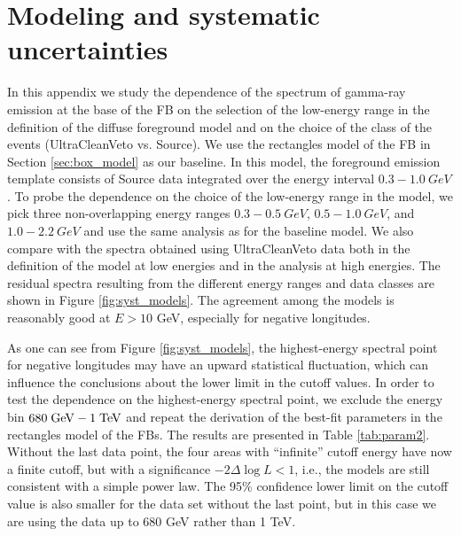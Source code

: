 \section{Modeling and systematic uncertainties}

In this appendix we study the dependence of the spectrum of gamma-ray emission at the base of the FB
on the selection of the low-energy range in the definition of the diffuse foreground model
and on the choice of the class of the events (UltraCleanVeto vs. Source).
We use the rectangles model of the FB in Section \ref{sec:box_model}
as our baseline.
In this model, the foreground emission template consists of Source data integrated over the energy interval $0.3 - \SI{1.0}{GeV}$. 
To probe the dependence on the choice of the low-energy range in the model, 
we pick three non-overlapping energy ranges $0.3 - \SI{0.5}{GeV}$, $0.5 - \SI{1.0}{GeV}$, and $1.0 - \SI{2.2}{GeV}$ 
and use the same analysis as for the baseline model. 
We also compare with the spectra obtained using UltraCleanVeto data both in the definition of the model
at low energies and in the analysis at high energies.
The residual spectra resulting from the different energy ranges and data classes are shown in Figure \ref{fig:syst_models}. 
The agreement among the models is reasonably good at $E > 10$ GeV, especially for negative longitudes.

As one can see from Figure \ref{fig:syst_models}, 
the highest-energy spectral point for negative longitudes may have an upward statistical fluctuation,
which can influence the conclusions about the lower limit in the cutoff values.
In order to test the dependence on the highest-energy spectral point, we exclude the energy bin $680\;{\rm GeV} - 1\;{\rm TeV}$ and 
repeat the derivation of the best-fit parameters in the rectangles model of the FBs.
The results are presented in Table \ref{tab:param2}.
Without the last data point, the four areas with ``infinite'' cutoff energy have now a finite cutoff,
but with a significance $-2\Delta \log L  < 1$, i.e., the models are still consistent with a simple power law.
The 95\% confidence lower limit on the cutoff value is also smaller for the data set without the last point,
but in this case we are using the data up to 680 GeV rather than 1 TeV.

